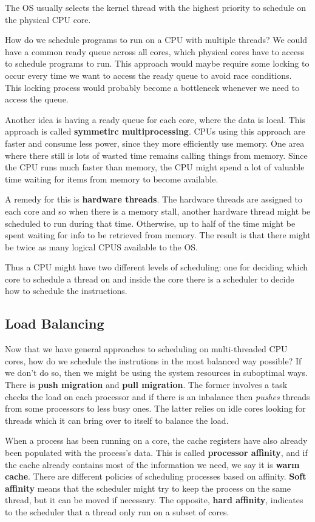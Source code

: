 \documentclass{tufte-handout}
\begin{document}
The OS usually selects the kernel thread with the highest priority to schedule on 
the physical CPU core. 

How do we schedule programs to run on a CPU with multiple threads? We could have a 
common ready queue across all cores, which physical cores have to access to schedule
programs to run. This approach would maybe require some locking to occur every time
we want to access the ready queue to avoid race conditions. This locking process
would probably become a bottleneck whenever we need to access the queue.

Another idea is having a ready queue for each core, where the data is local. This 
approach is called \textbf{symmetirc multiprocessing}. CPUs using this approach
are faster and consume less power, since they more efficiently use memory. One 
area where there still is lots of wasted time remains calling things from memory.
Since the CPU runs much faster than memory, the CPU might spend a lot of valuable 
time waiting for items from memory to become available.

A remedy for this is \textbf{hardware threads}. The hardware threads are assigned to 
each core and so when there is a memory stall, another hardware thread might be scheduled
to run during that time. Otherwise, up to half of the time might be spent waiting 
for info to be retrieved from memory. The result is that there might be twice as many 
logical CPUS available to the OS. 

Thus a CPU might have two different levels of scheduling: one for deciding which core to 
schedule a thread on and inside the core there is a scheduler to decide how to schedule
the instructions.

\subsection{Load Balancing}
Now that we have general approaches to scheduling on multi-threaded CPU cores, how do we 
schedule the instrutions in the most balanced way possible? If we don't do so, then we might
be using the system resources in suboptimal ways. There is \textbf{push migration} and 
\textbf{pull migration}. The former involves a task checks the load on each processor and 
if there is an inbalance then \textit{pushes} threads from some processors to less busy 
ones. The latter relies on idle cores looking for threads which it can bring over to 
itself to balance the load.

When a process has been running on a core, the cache registers have also already been populated
with the process's data. This is called \textbf{processor affinity}, and if the cache already 
contains most of the information we need, we say it is \textbf{warm cache}. There are different
policies of scheduling processes based on affinity. \textbf{Soft affinity} means that the 
scheduler might try to keep the process on the same thread, but it can be moved if necessary. 
The opposite, \textbf{hard affinity}, indicates to the scheduler that a thread only run 
on a subset of cores.
\end{document}
